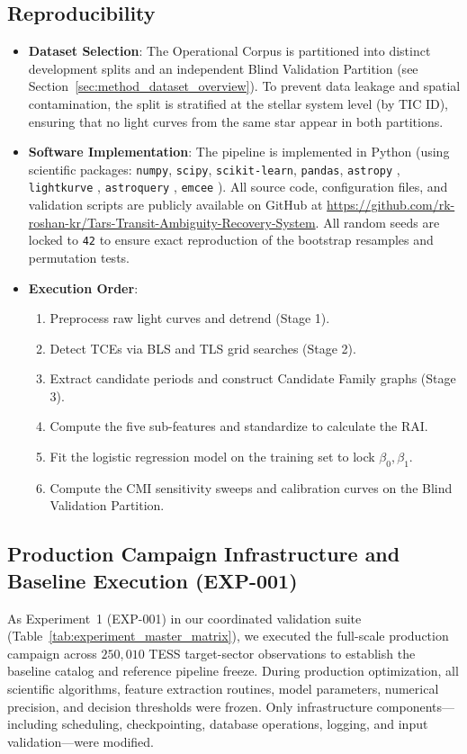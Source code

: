 \subsection{Reproducibility} \label{sec:method_reproducibility}
\begin{itemize}
\item \textbf{Dataset Selection}: The Operational Corpus is partitioned into distinct development splits and an independent Blind Validation Partition (see Section~\ref{sec:method_dataset_overview}). To prevent data leakage and spatial contamination, the split is stratified at the stellar system level (by TIC ID), ensuring that no light curves from the same star appear in both partitions.
\item \textbf{Software Implementation}: The pipeline is implemented in Python (using scientific packages: \texttt{numpy}, \texttt{scipy}, \texttt{scikit-learn}, \texttt{pandas}, \texttt{astropy} \citealt{Astropy2013, Astropy2018, Astropy2022}, \texttt{lightkurve} \citealt{Lightkurve2018}, \texttt{astroquery} \citealt{Ginsburg2019}, \texttt{emcee} \citealt{ForemanMackey2013}). All source code, configuration files, and validation scripts are publicly available on GitHub at \url{https://github.com/rk-roshan-kr/Tars-Transit-Ambiguity-Recovery-System}. All random seeds are locked to \texttt{42} to ensure exact reproduction of the bootstrap resamples and permutation tests.
\item \textbf{Execution Order}:
    \begin{enumerate}
    \item Preprocess raw light curves and detrend (Stage 1).
    \item Detect TCEs via BLS and TLS grid searches (Stage 2).
    \item Extract candidate periods and construct Candidate Family graphs (Stage 3).
    \item Compute the five sub-features and standardize to calculate the RAI.
    \item Fit the logistic regression model on the training set to lock $\beta_0, \beta_1$.
    \item Compute the CMI sensitivity sweeps and calibration curves on the Blind Validation Partition.
    \end{enumerate}
\end{itemize}

\subsection{Production Campaign Infrastructure and Baseline Execution (EXP-001)} \label{sec:method_exp1_production} \label{sec:method_freeze_infrastructure}
As Experiment~1 (EXP-001) in our coordinated validation suite (Table~\ref{tab:experiment_master_matrix}), we executed the full-scale production campaign across $250{,}010$ TESS target-sector observations to establish the baseline catalog and reference pipeline freeze. During production optimization, all scientific algorithms, feature extraction routines, model parameters, numerical precision, and decision thresholds were frozen. Only infrastructure components---including scheduling, checkpointing, database operations, logging, and input validation---were modified.

